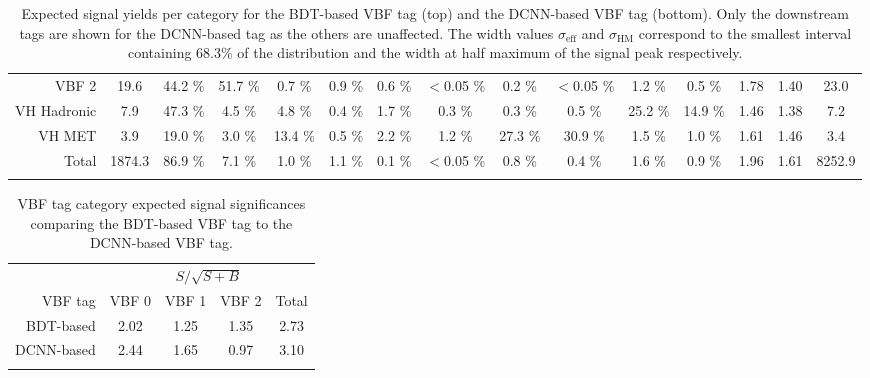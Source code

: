 \begin{landscape}
\begin{table}
{\begin{tabular}{rcccccccccccccc}
        \rowcolor{VBF2} VBF 2 &    19.6  &  44.2 \% &  51.7 \% &  0.7 \% &  0.9 \% &  0.6 \% &  $<$0.05 \% &  0.2 \% &  $<$0.05 \% &  1.2 \% &  0.5 \%& 1.78 & 1.40 & 23.0 \\
        \rowcolor{VHH} VH Hadronic &    7.9  &  47.3 \% &  4.5 \% &  4.8 \% &  0.4 \% &  1.7 \% &  0.3 \% &  0.3 \% &  0.5 \% &  25.2 \% &  14.9 \%& 1.46 & 1.38 & 7.2 \\
        \rowcolor{VHM} VH MET &    3.9  &  19.0 \% &  3.0 \% &  13.4 \% &  0.5 \% &  2.2 \% &  1.2 \% &  27.3 \% &  30.9 \% &  1.5 \% &  1.0 \%& 1.61 & 1.46 & 3.4 \\
        \rowcolor{Gray} Total &    1874.3  &  86.9 \% &  7.1 \% &  1.0 \% &  1.1 \% &  0.1 \% &  $<$0.05 \% &  0.8 \% &  0.4 \% &  1.6 \% &  0.9 \%& 1.96 & 1.61 & 8252.9 \\
        \thickhline
        \end{tabular}%
    }
        \caption{Expected signal yields per category for the BDT-based VBF tag (top) and the DCNN-based VBF tag (bottom). 
                 Only the downstream tags are shown for the DCNN-based tag as the others are unaffected.
                 The width values $\sigma_{\text{eff}}$ and $\sigma_{\text{HM}}$ correspond to the smallest interval 
                 containing 68.3\% of the \mgg distribution and the width at half maximum of the signal peak respectively.}
        \label{tab:stats_results:yield_table}
    \end{table}
\end{landscape}
\begin{table}[h!]
    \centering
    \renewcommand{\arraystretch}{1.3}
    \begin{tabular}{r|cccc}
        \thickhline
        & \multicolumn{4}{c}{$S/\sqrt{S+B}$} \\ 
        VBF tag & VBF 0 & VBF 1 & VBF 2 & Total \\
        \hline
        BDT-based  & 2.02 & 1.25 & 1.35 & 2.73\\
        DCNN-based & 2.44 & 1.65 & 0.97 & 3.10\\
        \thickhline
    \end{tabular}
    \caption{VBF tag category expected signal significances comparing the BDT-based VBF tag to the DCNN-based VBF tag.}
    \label{tab:stats_results:sig_table}
\end{table}



